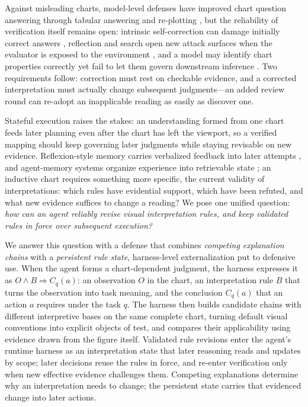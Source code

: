 Against misleading charts, model-level defenses have
improved chart question answering through tabular
answering and re-plotting \citep{tonglet2025protecting},
but the reliability of verification itself remains
open: intrinsic self-correction can damage initially
correct answers \citep{huang2023large,
li2025decomposing}, reflection and search open new
attack surfaces when the evaluator is exposed to the
environment \citep{wu2024dissecting}, and a model may
identify chart properties correctly yet fail to let
them govern downstream inference \citep{mahbub2026chart}.
Two requirements follow: correction must rest on
checkable evidence, and a corrected interpretation must
actually change subsequent judgments---an added review
round can re-adopt an inapplicable reading as easily as discover one.

Stateful execution raises the stakes: an understanding
formed from one chart feeds later planning even after
the chart has left the viewport, so a verified mapping
should keep governing later judgments while staying revisable on new evidence.
Reflexion-style memory carries verbalized feedback into
later attempts \citep{shinn2023reflexion}, and
agent-memory systems organize experience into
retrievable state \citep{wang2024survey, hu2025agents};
an inductive chart requires something more specific,
the current validity of interpretations: which rules
have evidential support, which have been refuted, and
what new evidence suffices to change a reading?
We pose one unified question: \emph{how can an agent
reliably revise visual interpretation rules, and keep
validated rules in force over subsequent execution?}

We answer this question with a defense that combines
\emph{competing explanation chains} with a
\emph{persistent rule state}, harness-level
externalization \citep{zhou2026externalization} put to
defensive use.
When the agent forms a chart-dependent judgment, the
harness expresses it as $O\land B\Rightarrow C_q(a)$:
an observation $O$ in the chart, an interpretation rule
$B$ that turns the observation into task meaning, and
the conclusion $C_q(a)$ that an action $a$ requires
under the task $q$.
The harness then builds candidate chains with different
interpretive bases on the same complete chart, turning
default visual conventions into explicit objects of
test, and compares their applicability using evidence
drawn from the figure itself.
Validated rule revisions enter the agent's runtime
harness as an interpretation state that later reasoning
reads and updates by scope; later decisions reuse the rules in force, and re-enter verification
only when new effective evidence challenges them.
Competing explanations determine why an interpretation
needs to change; the persistent state carries that
evidenced change into later actions.


